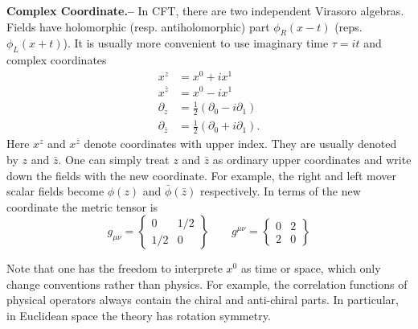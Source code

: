 \documentclass[submission, PhysLectNotes]{SciPost}
\begin{document}
{\bf Complex Coordinate.--}  In CFT, there are two independent Virasoro algebras. Fields have holomorphic (resp. antiholomorphic) part $\phi_R(x-t)$ (reps. $\phi_L(x+t)$). It is usually more convenient to use imaginary time $\tau = it$ and complex coordinates
\begin{equation}
\begin{aligned}
x^z &= x^0 + i x^1 \\
x^{\bar{z}} &= x^0 - i x^1 \\
\partial_z &= \frac{1}{2} \left( \partial_0 - i\partial_1 \right) \\
\partial_{\bar{z}} &= \frac{1}{2} \left( \partial_0 + i\partial_1 \right).
\end{aligned}
\end{equation}  
Here $x^z$ and $x^{\bar{z}}$ denote coordinates with upper index. They are usually denoted by $z$ and $\bar{z}$. One can simply treat $z$ and $\bar{z}$ as ordinary upper coordinates and write down the fields with the new coordinate. For example, the right and left mover scalar fields become $\phi(z)$ and $\bar{\phi}(\bar{z})$ respectively. In terms of the new coordinate the metric tensor is
\begin{equation}
	g_{\mu\nu} = \begin{Bmatrix}
        0    & 1/2  \\
        1/2  & 0     
    \end{Bmatrix} \qquad
	g^{\mu\nu} = \begin{Bmatrix}
        0 & 2  \\
        2 & 0
    \end{Bmatrix}
\end{equation}

Note that one has the freedom to interprete $x^0$ as time or space, which only change conventions rather than physics. For example, the correlation functions of physical operators always contain the chiral and anti-chiral parts. In particular, in Euclidean space the theory has rotation symmetry. 
\end{document}
